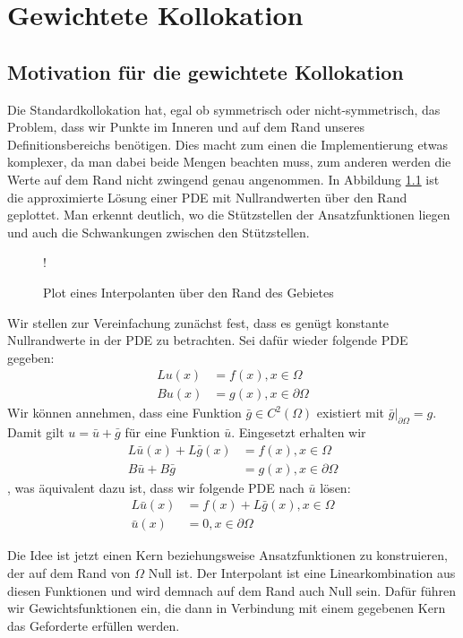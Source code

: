 \chapter{Gewichtete Kollokation}
\label{cha:Gewichtet}
\section{Motivation für die gewichtete Kollokation}
Die Standardkollokation hat, egal ob symmetrisch oder nicht-symmetrisch, das Problem, dass wir Punkte im Inneren und auf dem Rand unseres Definitionsbereichs benötigen. Dies macht zum einen die Implementierung etwas komplexer, da man dabei beide Mengen beachten muss, zum anderen werden die Werte auf dem Rand nicht zwingend genau angenommen. In Abbildung \ref{fig:rand} ist die approximierte Lösung einer \ac{PDE} mit Nullrandwerten über den Rand geplottet. Man erkennt deutlich, wo die Stützstellen der Ansatzfunktionen liegen und auch die Schwankungen zwischen den Stützstellen.
\begin{figure}[h]
\centering
\resizebox {\columnwidth} {!} {

}
\caption{Plot eines Interpolanten über den Rand des Gebietes}
\label{fig:rand}
\end{figure}

Wir stellen zur Vereinfachung zunächst fest, dass es genügt konstante Nullrandwerte in der \ac{PDE} zu betrachten. Sei dafür wieder folgende \ac{PDE} gegeben:
\begin{align*}
Lu(x) &= f(x), x\in \Omega\\
Bu(x) &= g(x), x \in \partial \Omega
\end{align*}
Wir können annehmen, dass eine Funktion $\bar{g} \in C^2(\Omega)$ existiert mit $\bar{g}|_{\partial \Omega} = g$. Damit gilt $u = \bar{u} + \bar{g}$ für eine Funktion $\bar{u}$. Eingesetzt erhalten wir
\begin{align*}
L\bar{u}(x) + L\bar{g}(x) &= f(x) , x \in \Omega\\
B\bar{u} + B\bar{g} &= g(x) , x \in \partial \Omega
\end{align*}
, was äquivalent dazu ist, dass wir folgende \ac{PDE} nach $\bar{u}$ lösen:
\begin{align*}
L\bar{u}(x) &= f(x) + L\bar{g}(x), x \in \Omega\\
\bar{u}(x) &= 0, x \in \partial \Omega
\end{align*}

Die Idee ist jetzt einen Kern beziehungsweise Ansatzfunktionen zu konstruieren, der auf dem Rand von $\Omega$ Null ist. Der Interpolant ist eine Linearkombination aus diesen Funktionen und wird demnach auf dem Rand auch Null sein. Dafür führen wir Gewichtsfunktionen ein, die dann in Verbindung mit einem gegebenen Kern das Geforderte erfüllen werden.

